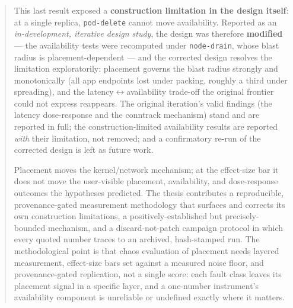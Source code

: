 \documentclass[11pt,a4paper]{report}
\begin{document}
\begin{abstract}
This last result exposed a \textbf{construction limitation in the design itself}:
at a single replica, \texttt{pod-delete} cannot move availability. Reported as an
\emph{in-development, iterative design study}, the design was therefore
\textbf{modified} --- the availability tests were recomputed under
\texttt{node-drain}, whose blast radius is placement-dependent --- and the
corrected design resolves the limitation exploratorily: placement governs the
blast radius strongly and monotonically (all app endpoints lost under packing,
roughly a third under spreading), and the latency$\leftrightarrow$availability
trade-off the original frontier could not express reappears. The original
iteration's valid findings (the latency dose-response and the conntrack
mechanism) stand and are reported in full; the construction-limited availability
results are reported \emph{with} their limitation, not removed; and a
confirmatory re-run of the corrected design is left as future work.

Placement moves the kernel/network mechanism; at the effect-size bar it does
not move the user-visible placement, availability, and dose-response outcomes the
hypotheses predicted. The thesis contributes a reproducible, provenance-gated
measurement methodology that surfaces and corrects its own construction
limitations, a positively-established but precisely-bounded mechanism, and a
discard-not-patch campaign protocol in which every quoted
number traces to an archived, hash-stamped run. The methodological point is that
chaos evaluation of placement needs layered measurement, effect-size bars set
against a measured noise floor, and provenance-gated replication, not a single
score: each fault class leaves its
placement signal in a specific layer, and a one-number instrument's availability
component is unreliable or undefined exactly where it matters.
\end{abstract}

\tableofcontents
\listoffigures










\appendix


\nocite{*}

\end{document}
